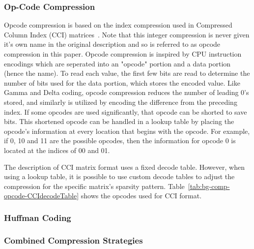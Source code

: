 \subsubsection{Op-Code Compression}
Opcode compression is based on the index compression used in Compressed Column Index (CCI) matrices~\cite{Lawlor:2013:compression}.
Note that this integer compression is never given it's own name in the original description and so is referred to as opcode compression in this paper.
Opcode compression is inspired by CPU instruction encodings which are seperated into an "opcode" portion and a data portion (hence the name).
To read each value, the first few bits are read to determine the number of bits used for the data portion, which stores the encoded value.
Like Gamma and Delta coding, opcode compression reduces the number of leading 0's stored, and similarly is utilized by encoding the difference from the preceding index.
If some opcodes are used significantly, that opcode can be shorted to save bits.
This shortened opcode can be handled in a lookup table by placing the opcode's information at every location that begins with the opcode.
For example, if 0, 10 and 11 are the possible opcodes, then the information for opcode 0 is located at the indices of 00 and 01.

The description of CCI matrix format uses a fixed decode table.
However, when using a lookup table, it is possible to use custom decode tables to adjust the compression for the specific matrix's sparsity pattern.
Table~\ref{tab:bg-comp-opcode-CCIdecodeTable} shows the opcodes used for CCI format.



\subsubsection{Huffman Coding}
\label{sec:bg-comp-huffman}

\subsubsection{Combined Compression Strategies}
\label{sec:bg-comp-combined}

